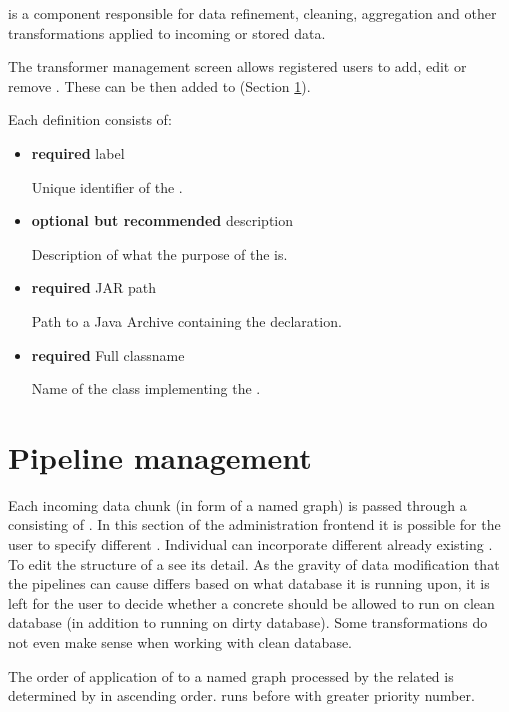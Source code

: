 	 is a component responsible for data refinement, cleaning, aggregation and other transformations applied to incoming or stored data.

	The transformer management screen allows registered users to add, edit or remove . These can be then added to  (Section \ref{sec:pipelineManagement}).
	
	Each  definition consists of:
	\begin{itemize}
		\item \textbf{required} label
		
		Unique identifier of the .
		
		\item \textbf{optional but recommended} description
		
		Description of what the purpose of the  is.
		
		\item \textbf{required} JAR path
		
		Path to a Java Archive containing the  declaration.
		
		\item \textbf{required} Full classname
		
		Name of the class implementing the .
	\end{itemize}

\section{Pipeline management}
\label{sec:pipelineManagement}

	Each incoming data chunk (in form of a named graph) is passed through a  consisting of . In this section of the administration frontend it is possible for the user to specify different . Individual  can incorporate different already existing . To edit the structure of a  see its detail. As the gravity of data modification that the pipelines can cause differs based on what database it is running upon, it is left for the user to decide whether a concrete  should be allowed to run on clean database (in addition to running on dirty database). Some transformations do not even make sense when working with clean database.
	
	The order of application of  to a named graph processed by the related  is determined by  in ascending order.  runs before  with greater priority number.
	
